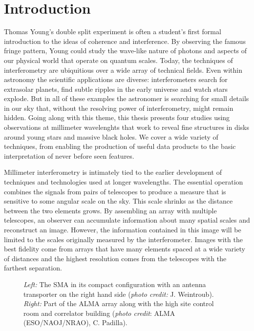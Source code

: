 \chapter{Introduction}\label{chapter:introduction}

Thomas Young's double split experiment is often a student's first formal introduction to the ideas of 
coherence and interference.  By observing the famous fringe pattern, Young could study the wave-like nature of 
photons and aspects of our physical world that operate on quantum scales.  Today, the techniques of interferometry
are ubiquitious over a wide array of technical fields.  Even within astronomy the scientific applications are 
diverse: interferometers  search for extrasolar planets, find subtle ripples in the early universe and watch 
stars explode.  But in all of these examples the astronomer is searching for small details in our sky that, 
without the resolving power of interferometry, might remain hidden.  Going along with this theme, this thesis 
presents four studies using observations at millimeter wavelenghts that work to reveal fine structures in disks 
around young stars and massive black holes.  We cover a wide variety of techniques, from enabling the production 
of useful data products to the basic interpretation of never before seen features.

Millimeter interferometry is intimately tied to the earlier development of techniques and technologies 
used at longer wavelengths.  The essential operation combines the signals from pairs of telescopes to produce a 
measure that is sensitive to some angular scale on the sky.  This scale shrinks as the distance
between the two elements grows.  By assembling an array with multiple 
telescopes, an observer can accumulate information about many spatial scales and reconstruct an image.  However,
the information contained in this image will be limited to the scales originally measured by the interferometer.
Images with the best fidelity come from arrays that have many elements spaced at a wide variety of 
distances and the highest resolution comes from the telescopes with the farthest separation.

\begin{figure}[t!]
\caption{{\it Left:} The SMA in its compact configuration with an antenna transporter on the right hand side 
({\it photo credit:} J. Weintroub).  {\it Right:} Part of the ALMA array along with the high site control room and correlator building ({\it photo credit}: ALMA (ESO/NAOJ/NRAO), C. Padilla).}
\label{fig:sma_alma}
\end{figure}

